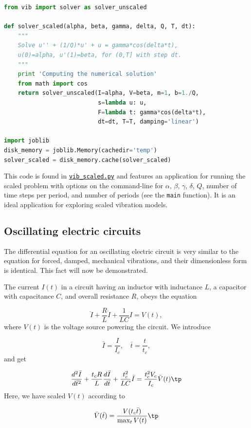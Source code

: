 \documentclass[graybox,envcountchap,sectrefs,final]{svmonodo}
\begin{document}
\begin{lstlisting}[language=Python,style=graycolor]
from vib import solver as solver_unscaled

def solver_scaled(alpha, beta, gamma, delta, Q, T, dt):
    """
    Solve u'' + (1/Q)*u' + u = gamma*cos(delta*t),
    u(0)=alpha, u'(1)=beta, for (0,T] with step dt.
    """
    print 'Computing the numerical solution'
    from math import cos
    return solver_unscaled(I=alpha, V=beta, m=1, b=1./Q,
                           s=lambda u: u,
                           F=lambda t: gamma*cos(delta*t),
                           dt=dt, T=T, damping='linear')

import joblib
disk_memory = joblib.Memory(cachedir='temp')
solver_scaled = disk_memory.cache(solver_scaled)
\end{lstlisting}
This code is found in \href{{http://tinyurl.com/o8pb3yy/vib_scaled.py}}{\nolinkurl{vib_scaled.py}}
and features an application for running the scaled problem with
options on the command-line for $\alpha$, $\beta$, $\gamma$, $\delta$,
$Q$, number of time steps per period, and number of periods (see
the \texttt{main} function). It is an ideal application for exploring
scaled vibration models.


\subsection{Oscillating electric circuits}

The differential equation for an oscillating electric circuit is
very similar to the equation for forced, damped,
mechanical vibrations, and their
dimensionless form is identical. This fact will now be demonstrated.

The current $I(t)$ in a
circuit having an inductor with inductance $L$, a capacitor with
capacitance $C$, and overall resistance $R$, obeys the equation

\begin{equation}
\ddot I + \frac{R}{L}\dot I + \frac{1}{LC}I =  V(t),
\end{equation}
where $V(t)$ is the voltage source powering the circuit.
We introduce

\[ \bar I=\frac{I}{I_c},\quad \bar t = \frac{t}{t_c},\]
and get

\[ \frac{d^2\bar I}{d\bar t^2} + \frac{t_c R}{L}\frac{d\bar I}{d\bar t}
+ \frac{t_c^2}{LC}\bar I = \frac{t_c^2V_c}{I_c} \bar V(t)\tp\]
Here, we have scaled $V(t)$ according to

\[ \bar V(\bar t) = \frac{V(t_c\bar t)}{\max_t V(t)}\tp\]
\end{document}
